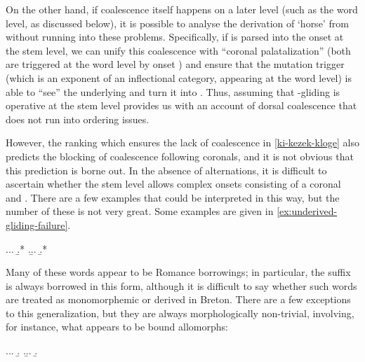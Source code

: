 On the other hand, if coalescence itself happens on a later level (such as the word level, as discussed below), it is possible to analyse the derivation of \ipa{[ʧɛzəɡ̊]} `horse' from  without running into these problems. Specifically, if \ipa{[i]} is  parsed into the onset at the stem level, we can unify this coalescence with \enquote{coronal palatalization} (both are triggered at the word level by onset \ipa{[i]}) and ensure that the mutation trigger (which is an exponent of an inflectional category, appearing at the word level) is able to \enquote{see} the underlying \ipa{[k]} and turn it into \ipa{[h]}. Thus, assuming that \ipa{[i]}-gliding is operative at the stem level provides us with an account of dorsal\endash\ipa{[j]} coalescence that does not run into ordering issues.

However, the ranking which ensures the lack of coalescence in \ref{ki-kezek-kloge} also predicts the blocking of coalescence following coronals, and it is not obvious that this prediction is borne out. In the absence of alternations, it is difficult to ascertain whether the stem level allows complex onsets consisting of a coronal and \ipa{[i]}. There are a few examples that could be interpreted in this way, but the number of these is not very great. Some examples are given in \ref{ex:underived-gliding-failure}.

\ex.\label{ex:underived-gliding-failure}\a.\label{pasiantaat}\a.
\b.*
\z.\b.\a.
\b.*\mbi{[komprəˈnaʃon]}

Many of these words appear to be Romance borrowings; in particular, the suffix  is always borrowed in this form, although it is difficult to say whether such words are treated as monomorphemic or derived in Breton. There are a few exceptions to this generalization, but they are always morphologically non-trivial, involving, for instance, what appears to be bound allomorphs:

\ex.\label{ex:anaoudegezh-talvoudegezh}\a.\a.
\b.
\z.\b.\a.
\b.


